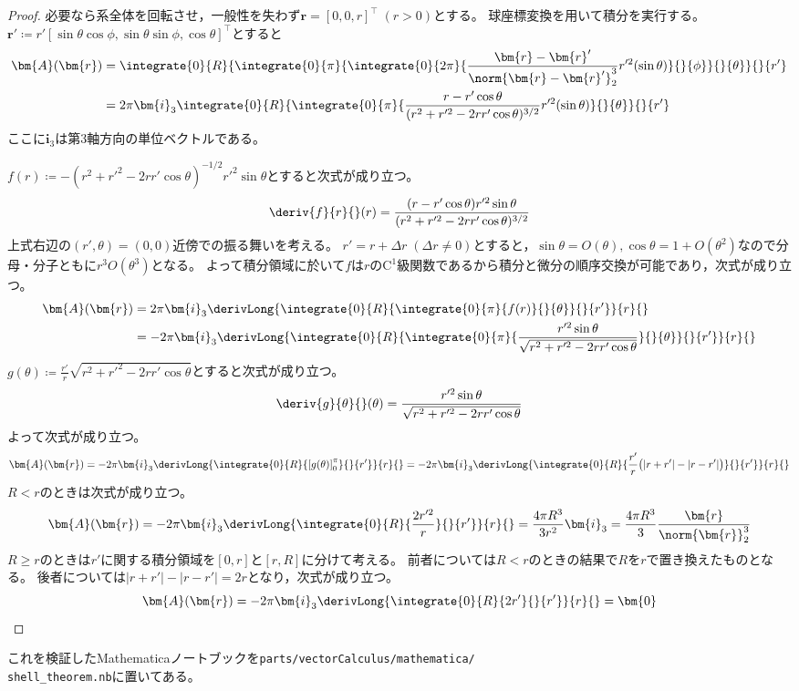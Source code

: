             \begin{proof}
                \quad\par
                必要なら系全体を回転させ，一般性を失わず$\bm{r} = [0,0,r]^\top\;(r>0)$とする。
                球座標変換を用いて積分を実行する。
                $\bm{r}' \coloneq r'[\sin\theta\cos\phi,\sin\theta\sin\phi,\cos\theta]^\top$とすると
                \begin{align*}
                    \bm{A}(\bm{r}) &= \integrate{0}{R}{\integrate{0}{\pi}{\integrate{0}{2\pi}{\frac{\bm{r}-\bm{r}'}{\norm{\bm{r}-\bm{r}'}_2^3}r'^2(\sin\theta)}{}{\phi}}{}{\theta}}{}{r'} \\
                    &= 2\pi\bm{i}_3\integrate{0}{R}{\integrate{0}{\pi}{\frac{r-r'\cos\theta}{(r^2+r'^2-2rr'\cos\theta)^{3/2}}r'^2(\sin\theta)}{}{\theta}}{}{r'}
                \end{align*}
                ここに$\bm{i}_3$は第3軸方向の単位ベクトルである。
                \par
                $f(r) \coloneq -(r^2+r'^2-2rr'\cos\theta)^{-1/2}r'^2\sin\theta$とすると次式が成り立つ。
                \[ \deriv{f}{r}{}(r) = \frac{(r-r'\cos\theta)r'^2\sin\theta}{(r^2+r'^2-2rr'\cos\theta)^{3/2}} \]
                上式右辺の$(r',\theta)=(0,0)$近傍での振る舞いを考える。
                $r'=r+\Delta r\;(\Delta r\neq 0)$とすると，$\sin\theta = O(\theta),\cos\theta = 1+O(\theta^2)$なので分母・分子ともに$r^3 O(\theta^3)$となる。
                よって積分領域に於いて$f$は$r$の$\mathrm{C}^1$級関数であるから積分と微分の順序交換が可能であり，次式が成り立つ。
                \begin{align*}
                    \bm{A}(\bm{r}) &= 2\pi\bm{i}_3\derivLong{\integrate{0}{R}{\integrate{0}{\pi}{f(r)}{}{\theta}}{}{r'}}{r}{} \\
                    &= -2\pi\bm{i}_3\derivLong{\integrate{0}{R}{\integrate{0}{\pi}{\frac{r'^2\sin\theta}{\sqrt{r^2+r'^2-2rr'\cos\theta}}}{}{\theta}}{}{r'}}{r}{}
                \end{align*}
                $g(\theta) \coloneq \frac{r'}{r}\sqrt{r^2+r'^2-2rr'\cos\theta}$とすると次式が成り立つ。
                \[ \deriv{g}{\theta}{}(\theta) = \frac{r'^2\sin\theta}{\sqrt{r^2+r'^2-2rr'\cos\theta}} \]
                よって次式が成り立つ。
                \[ \bm{A}(\bm{r}) = -2\pi\bm{i}_3\derivLong{\integrate{0}{R}{\left[g(\theta)\right]_0^\pi}{}{r'}}{r}{} = -2\pi\bm{i}_3\derivLong{\integrate{0}{R}{\frac{r'}{r}\bigl(|r+r'|-|r-r'|\bigr)}{}{r'}}{r}{} \]
                $R<r$のときは次式が成り立つ。
                \[ \bm{A}(\bm{r}) = -2\pi\bm{i}_3\derivLong{\integrate{0}{R}{\frac{2r'^2}{r}}{}{r'}}{r}{} = \frac{4\pi R^3}{3r^2}\bm{i}_3 = \frac{4\pi R^3}{3}\frac{\bm{r}}{\norm{\bm{r}}_2^3} \]
                $R\geq r$のときは$r'$に関する積分領域を$[0,r]$と$[r,R]$に分けて考える。
                前者については$R<r$のときの結果で$R$を$r$で置き換えたものとなる。
                後者については$|r+r'|-|r-r'| = 2r$となり，次式が成り立つ。
                \[ \bm{A}(\bm{r}) = -2\pi\bm{i}_3\derivLong{\integrate{0}{R}{2r'}{}{r'}}{r}{} = \bm{0} \]
            \end{proof}
            これを検証したMathematicaノートブックを\texttt{parts/vectorCalculus/mathematica/\\ shell\_theorem.nb}に置いてある。
